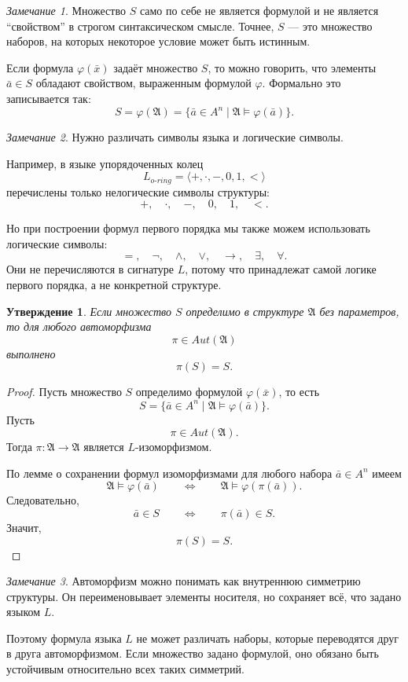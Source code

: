 \documentclass[12pt,a4paper,oneside,openany]{book}
\theoremstyle{definition}
\theoremstyle{plain}
\newtheorem{proposition}{Утверждение}[chapter]
\theoremstyle{remark}
\newtheorem{remark}{Замечание}[chapter]
\begin{document}
\begin{remark}
Множество $S$ само по себе не является формулой и не является ``свойством'' в строгом синтаксическом смысле. Точнее, $S$ — это множество наборов, на которых некоторое условие может быть истинным.

Если формула $\varphi(\bar x)$ задаёт множество $S$, то можно говорить, что элементы $\bar a\in S$ обладают свойством, выраженным формулой $\varphi$. Формально это записывается так:
\[
S=\varphi(\mathfrak A)
=
\{\bar a\in A^n\mid \mathfrak A\models\varphi(\bar a)\}.
\]
\end{remark}

\begin{remark}
Нужно различать символы языка и логические символы.

Например, в языке упорядоченных колец
\[
L_{o\text{-}ring}
=
\langle +,\cdot,-,0,1,<\rangle
\]
перечислены только нелогические символы структуры:
\[
+,\quad \cdot,\quad -,\quad 0,\quad 1,\quad <.
\]

Но при построении формул первого порядка мы также можем использовать логические символы:
\[
=,\quad \neg,\quad \wedge,\quad \vee,\quad \to,\quad \exists,\quad \forall.
\]
Они не перечисляются в сигнатуре $L$, потому что принадлежат самой логике первого порядка, а не конкретной структуре.
\end{remark}

\begin{proposition}
Если множество $S$ определимо в структуре $\mathfrak A$ без параметров, то для любого автоморфизма
\[
\pi\in Aut(\mathfrak A)
\]
выполнено
\[
\pi(S)=S.
\]
\end{proposition}

\begin{proof}
Пусть множество $S$ определимо формулой $\varphi(\bar x)$, то есть
\[
S=
\{\bar a\in A^n\mid \mathfrak A\models\varphi(\bar a)\}.
\]
Пусть
\[
\pi\in Aut(\mathfrak A).
\]
Тогда $\pi:\mathfrak A\to\mathfrak A$ является $L$-изоморфизмом.

По лемме о сохранении формул изоморфизмами для любого набора $\bar a\in A^n$ имеем
\[
\mathfrak A\models\varphi(\bar a)
\qquad
\Longleftrightarrow
\qquad
\mathfrak A\models\varphi(\pi(\bar a)).
\]
Следовательно,
\[
\bar a\in S
\qquad
\Longleftrightarrow
\qquad
\pi(\bar a)\in S.
\]
Значит,
\[
\pi(S)=S.
\]
\end{proof}

\begin{remark}
Автоморфизм можно понимать как внутреннюю симметрию структуры. Он переименовывает элементы носителя, но сохраняет всё, что задано языком $L$.

Поэтому формула языка $L$ не может различать наборы, которые переводятся друг в друга автоморфизмом. Если множество задано формулой, оно обязано быть устойчивым относительно всех таких симметрий.
\end{remark}
\end{document}
